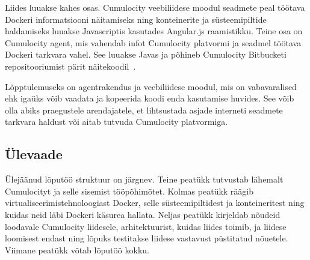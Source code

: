 \documentclass[12pt]{article}
\begin{document}
  Liides luuakse kahes osas. Cumulocity veebiliidese moodul seadmete peal töötava
  Dockeri informatsiooni näitamiseks ning konteinerite ja süsteemipiltide haldamiseks
  luuakse Javascriptis kasutades Angular.js raamistikku. Teine osa on Cumulocity agent,
  mis vahendab infot Cumulocity platvormi ja seadmel töötava Dockeri tarkvara vahel.
  See luuakse Javas ja põhineb Cumulocity Bitbucketi
  repositooriumist pärit näitekoodil~\cite{cumulocityExamplesRepository}.

  Lõpptulemuseks on agentrakendus ja veebiliidese moodul, mis on vabavaralised ehk igaüks võib
  vaadata ja kopeerida koodi enda kasutamise huvides. See võib olla abiks praegustele
  arendajatele, et lihtsustada asjade interneti seadmete tarkvara haldust või aitab
  tutvuda Cumulocity platvormiga.


  \subsection{Ülevaade}
  Ülejäänud lõputöö struktuur on järgnev.
  Teine peatükk tutvustab lähemalt Cumulocityt ja selle sisemist tööpõhimõtet. Kolmas peatükk
  räägib virtualiseerimistehnoloogiast Docker, selle süsteemipiltidest ja konteineritest
  ning kuidas neid läbi Dockeri käsurea hallata. Neljas peatükk kirjeldab nõudeid loodavale
  Cumulocity liidesele, arhitektuurist, kuidas liides toimib, ja liidese loomisest endast
  ning lõpuks testitakse liidese vastavust püstitatud nõuetele. Viimane peatükk võtab
  lõputöö kokku.






\end{document}
